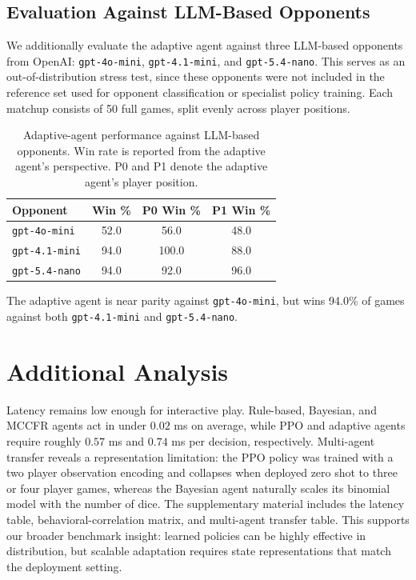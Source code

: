 \documentclass{article}
\begin{document}
\subsection{Evaluation Against LLM-Based Opponents}

We additionally evaluate the adaptive agent against three LLM-based opponents from OpenAI:
\texttt{gpt-4o-mini}, \texttt{gpt-4.1-mini}, and \texttt{gpt-5.4-nano}. This serves as an out-of-distribution stress test, since these opponents were not included in the reference set used for opponent classification or specialist policy training. Each matchup consists of 50 full games, split evenly across player positions.

\begin{table}[t]
\centering
\small
\begin{tabular}{lccc}
\hline
Opponent  & Win \% & P0 Win \% & P1 Win \%  \\
\hline
\texttt{gpt-4o-mini}   & 52.0  & 56.0 & 48.0   \\
\texttt{gpt-4.1-mini}  & 94.0  & 100.0 & 88.0 \\
\texttt{gpt-5.4-nano}  & 94.0 & 92.0 & 96.0   \\
\hline
\end{tabular}
\caption{
Adaptive-agent performance against LLM-based opponents. Win rate is reported
from the adaptive agent's perspective. P0 and P1 denote the adaptive agent's
player position.
}
\label{tab:llm_opponents}
\end{table}

The adaptive agent is near parity against \texttt{gpt-4o-mini}, but wins
94.0\% of games against both \texttt{gpt-4.1-mini} and \texttt{gpt-5.4-nano}.





\section{Additional Analysis}
Latency remains low enough for interactive play. Rule-based, Bayesian, and MCCFR agents act in under $0.02$ ms on average, while PPO and adaptive agents require roughly $0.57$ ms and $0.74$ ms per decision, respectively. Multi-agent transfer reveals a representation limitation: the PPO policy was trained with a two player observation encoding and collapses when deployed zero shot to three or four player games, whereas the Bayesian agent naturally scales its binomial model with the number of dice. The supplementary material includes the latency table, behavioral-correlation matrix, and multi-agent transfer table. This supports our broader benchmark insight: learned policies can be highly effective in distribution, but scalable adaptation requires state representations that match the deployment setting.
\end{document}
